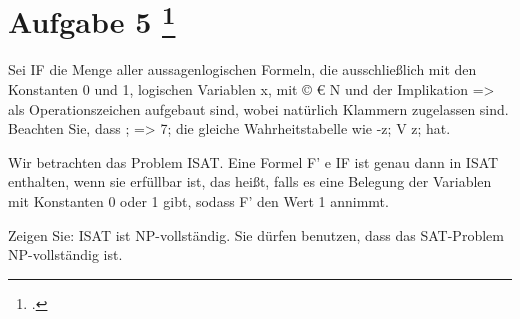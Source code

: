\documentclass{lehramt-informatik-aufgabe}
\begin{document}
\liAufgabenTitel{}
\section{Aufgabe 5
\footcite{66115:2020:09}}

Sei IF die Menge aller aussagenlogischen Formeln, die ausschließlich mit den Konstanten 0 und
1, logischen Variablen x, mit © € N und der Implikation => als Operationszeichen aufgebaut
sind, wobei natürlich Klammern zugelassen sind. Beachten Sie, dass ; => 7; die gleiche
Wahrheitstabelle wie -z; V z; hat.

Wir betrachten das Problem ISAT. Eine Formel F' e IF ist genau dann in ISAT enthalten, wenn
sie erfüllbar ist, das heißt, falls es eine Belegung der Variablen mit Konstanten 0 oder 1 gibt,
sodass F' den Wert 1 annimmt.

Zeigen Sie: ISAT ist NP-vollständig. Sie dürfen benutzen, dass das SAT-Problem NP-vollständig
ist.
\end{document}
